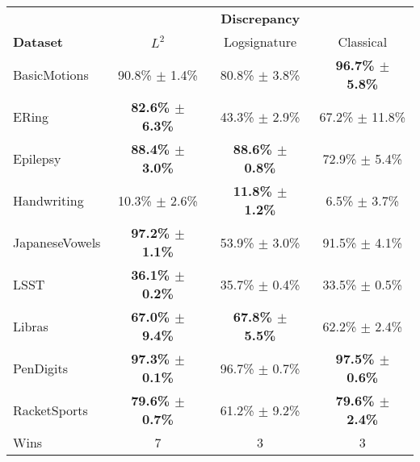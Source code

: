 \begin{tabular}{lccc}
\toprule
{} & \multicolumn{3}{c}{\textbf{Discrepancy}} \\ \cmidrule{2-4}
\textbf{Dataset} &          $L^2$ &   Logsignature &                Classical \\
\midrule
BasicMotions    &    90.8\% $\pm$ 1.4\% &  80.8\% $\pm$ 3.8\% &  \textbf{96.7\% $\pm$ 5.8\%} \\
ERing           &    \textbf{82.6\% $\pm$ 6.3\%} &  43.3\% $\pm$ 2.9\% &  67.2\% $\pm$ 11.8\% \\
Epilepsy        &    \textbf{88.4\% $\pm$ 3.0\%} &  \textbf{88.6\% $\pm$ 0.8\%} &  72.9\% $\pm$ 5.4\% \\
Handwriting     &    10.3\% $\pm$ 2.6\% &  \textbf{11.8\% $\pm$ 1.2\%} &  6.5\% $\pm$ 3.7\% \\
JapaneseVowels  &    \textbf{97.2\% $\pm$ 1.1\%} &  53.9\% $\pm$ 3.0\% &  91.5\% $\pm$ 4.1\% \\
LSST            &    \textbf{36.1\% $\pm$ 0.2\%} &  35.7\% $\pm$ 0.4\% &  33.5\% $\pm$ 0.5\% \\
Libras          &    \textbf{67.0\% $\pm$ 9.4\%} &  \textbf{67.8\% $\pm$ 5.5\%} &  62.2\% $\pm$ 2.4\% \\
PenDigits       &    \textbf{97.3\% $\pm$ 0.1\%} &  96.7\% $\pm$ 0.7\% &  \textbf{97.5\% $\pm$ 0.6\%} \\
RacketSports    &    \textbf{79.6\% $\pm$ 0.7\%} &  61.2\% $\pm$ 9.2\% &  \textbf{79.6\% $\pm$ 2.4\%} \\
\midrule
Wins &            7 &                 3 &    3 \\
\bottomrule
\end{tabular}
